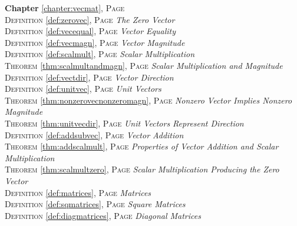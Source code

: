\begin{multicols}{2}
      \setlength{\parindent}{0pt}
      \footnotesize{
         \textbf{Chapter} \ref{chapter:vecmat}, \textsc{Page} \pageref{chapter:vecmat} \\
         \textsc{Definition} \ref{def:zerovec}, \textsc{Page} \pageref{def:zerovec} \textit{The Zero Vector} \\
         \textsc{Definition} \ref{def:vecequal}, \textsc{Page} \pageref{def:vecequal} \textit{Vector Equality} \\
         \textsc{Definition} \ref{def:vecmagn}, \textsc{Page} \pageref{def:vecmagn} \textit{Vector Magnitude} \\
         \textsc{Definition} \ref{def:scalmult}, \textsc{Page} \pageref{def:scalmult} \textit{Scalar Multiplication} \\
         \textsc{Theorem} \ref{thm:scalmultandmagn}, \textsc{Page} \pageref{thm:scalmultandmagn} \textit{Scalar Multiplication and Magnitude} \\
         \textsc{Definition} \ref{def:vectdir}, \textsc{Page} \pageref{def:vectdir} \textit{Vector Direction} \\
         \textsc{Definition} \ref{def:unitvec}, \textsc{Page} \pageref{def:unitvec} \textit{Unit Vectors} \\
         \textsc{Theorem} \ref{thm:nonzerovecnonzeromagn}, \textsc{Page} \pageref{thm:nonzerovecnonzeromagn} \textit{Nonzero Vector Implies Nonzero Magnitude} \\
         \textsc{Theorem} \ref{thm:unitvecdir}, \textsc{Page} \pageref{thm:unitvecdir} \textit{Unit Vectors Represent Direction} \\
         \textsc{Definition} \ref{def:addsubvec}, \textsc{Page} \pageref{def:addsubvec} \textit{Vector Addition} \\
         \textsc{Theorem} \ref{thm:addscalmult}, \textsc{Page} \pageref{thm:addscalmult} \textit{Properties of Vector Addition and Scalar Multiplication} \\
         \textsc{Theorem} \ref{thm:scalmultzero}, \textsc{Page} \pageref{thm:scalmultzero} \textit{Scalar Multiplication Producing the Zero Vector} \\
         \textsc{Definition} \ref{def:matrices}, \textsc{Page} \pageref{def:matrices} \textit{Matrices} \\
         \textsc{Definition} \ref{def:sqmatrices}, \textsc{Page} \pageref{def:sqmatrices} \textit{Square Matrices} \\
         \textsc{Definition} \ref{def:diagmatrices}, \textsc{Page} \pageref{def:diagmatrices} \textit{Diagonal Matrices} \\
}
\end{multicols}
